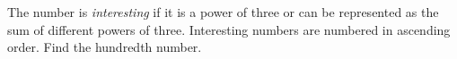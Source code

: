 \problem
The number is \emph{interesting} if it is a power of three or can be
represented as the sum of different powers of three.
Interesting numbers are numbered in ascending order.
Find the hundredth number.
\solution
\endproblem

